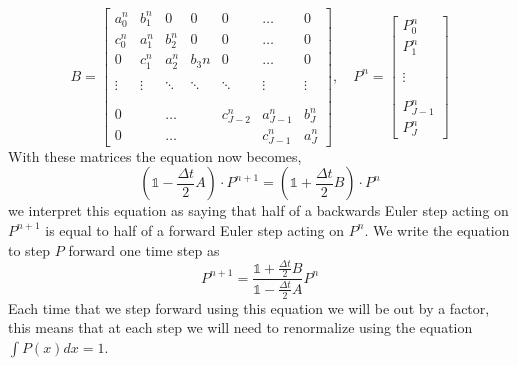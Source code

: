 \begin{equation}
B =
\begin{bmatrix}
	a_0^{n} & b_1^{n}     & 0                 & 0          & 0                    & \dots            & 0        \\
	c_0^{n} & a_1^{n}     & b_2^{n}      & 0          & 0                    & \dots            & 0        \\
	0                & c_1^{n} & a_2^{n}      & b_3{n} & 0                    & \dots            & 0        \\
			     &               &                   &             &                      &                     &           \\
	\vdots         & \vdots     & \ddots         & \ddots   & \ddots            & \vdots           & \vdots \\
			     &               &                   &             &                      &                     &           \\
			     &               &                   &             &                      &                     &           \\
	0                &               & \dots           &             &  c_{J-2}^{n} & a_{J-1}^{n}  & b_J^{n} \\
	0                &               & \dots           &             &                     &  c_{J-1}^{n} & a_J^{n}
\end{bmatrix}
,\quad P^{n} =
\begin{bmatrix}
P_0^{n}       \\
P_1^n          \\
                    \\
                    \\
\vdots           \\
                    \\
                    \\
P_{J-1}^{n} \\
P_J^{n}
\end{bmatrix}
\end{equation}
With these matrices the equation now becomes,
\begin{equation}
\left (\mathbb{1} - \frac{\Delta t}{2}A \right) \cdot P^{n+1} = \left (\mathbb{1} + \frac{\Delta t}{2}B \right) \cdot P^n
\end{equation}
we interpret this equation as saying that half of a backwards Euler step acting on $P^{n+1}$ is equal to half of a forward Euler step acting on $P^n$. We write the equation to step $P$ forward one time step as
\begin{equation}
P^{n+1} = \frac{\mathbb{1} + \frac{\Delta t}{2}B}{\mathbb{1} - \frac{\Delta t}{2}A} P^n
\end{equation}
Each time that we step forward using this equation we will be out by a factor, this means that at each step we will need to renormalize using the equation $\int P(x) dx = 1$.

